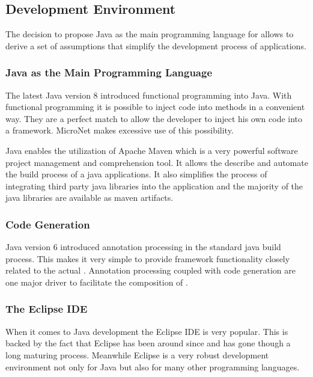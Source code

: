 \subsection{Development Environment}

The decision to propose Java as the main programming language for \mss{} allows
to derive a set of assumptions that simplify the development process of \ms{}
applications.

\subsubsection{Java as the Main Programming Language}

The latest Java version 8 introduced functional programming into Java. With
functional programming it is possible to inject code into methods in a
convenient way. They are a perfect match to allow the developer to inject his
own code into a framework. MicroNet makes excessive use of this possibility.

Java enables the utilization of Apache Maven which is a very powerful software
project management and comprehension tool. It allows the describe and automate
the build process of a java applications. It also simplifies the process of
integrating third party java libraries into the application and the majority of
the java libraries are available as maven artifacts.

\subsubsection{Code Generation}

Java version 6 introduced annotation processing in the standard java build
process. This makes it very simple to provide framework functionality closely
related to the actual \og{}. Annotation processing coupled with code generation
are one major driver to facilitate the composition of \mss{}.

\subsubsection{The Eclipse IDE}

When it comes to Java development the Eclipse IDE is very popular. This is
backed by the fact that Eclipse has been around since  and has gone
though a long maturing process. Meanwhile Eclipse is a very robust development
environment not only for Java but also for many other programming languages. 

